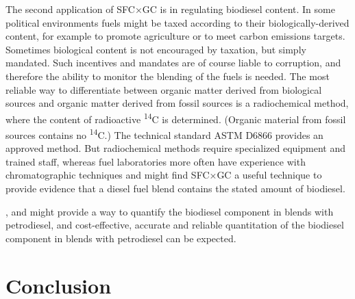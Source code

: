 The second application of SFC×GC is in regulating biodiesel content. In some
political environments fuels might be taxed according to their
biologically-derived content, for example to promote agriculture or to meet
carbon emissions targets. Sometimes biological content is not encouraged by
taxation, but simply mandated. Such incentives and mandates are of course liable
to corruption, and therefore the ability to monitor the blending of the fuels is
needed. The most reliable way to differentiate between organic matter derived
from biological sources and organic matter derived from fossil sources is a
radiochemical method, where the content of radioactive \textsuperscript{14}C is
determined. (Organic material from fossil sources contains no
\textsuperscript{14}C.) The technical standard ASTM D6866 provides an approved
method. But radiochemical methods require specialized equipment and trained
staff, whereas fuel laboratories more often have experience with chromatographic
techniques and might find SFC×GC a useful technique to provide evidence that a
diesel fuel blend contains the stated amount of biodiesel.


, and might provide a way to quantify the biodiesel component in blends
with petrodiesel, and cost-effective, accurate and reliable quantitation of the
biodiesel component in blends with petrodiesel can be expected.


\section{Conclusion}

\todos